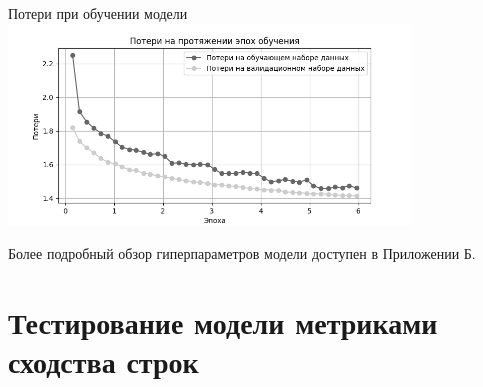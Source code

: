 \documentclass[LI,VKR]{HSEUniversity}
\begin{document}
\begin{FIGURE}[h]{Потери при обучении модели \label{fig:loss-plot-epoch}}
\includegraphics[width=0.8\textwidth]{img/loss-plot-epoch}
\end{FIGURE}

Более подробный обзор гиперпараметров модели доступен в Приложении Б.

\section{Тестирование модели метриками сходства строк}

\end{document}
